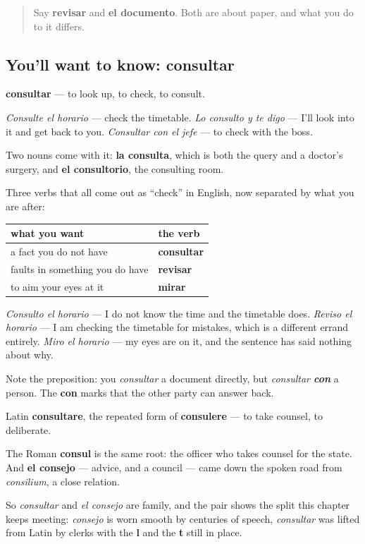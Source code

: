 \label{lesson:ES-C453-consultar}



\begin{quote}
Say \textbf{revisar} and \textbf{el documento}. Both are about paper, and what you do to it differs.
\end{quote}

\subsection*{You'll want to know: consultar}
\textbf{consultar} — to look up, to check, to consult.

\emph{Consulte el horario} — check the timetable. \emph{Lo consulto y te digo} — I'll look into it and get back to you. \emph{Consultar con el jefe} — to check with the boss.

Two nouns come with it: \textbf{la consulta}, which is both the query and a doctor's surgery, and \textbf{el consultorio}, the consulting room.

\begin{grammarlens}[title={Grammar Lens: consultar, revisar, mirar}]
Three verbs that all come out as \textquotedblleft{}check\textquotedblright{} in English, now separated by what you are after:

\noindent
\begin{tabularx}{\linewidth}{@{}>{\raggedright\arraybackslash}X>{\raggedright\arraybackslash}X@{}}
\toprule
\textbf{what you want} & \textbf{the verb} \\
\midrule
a fact you do not have & \textbf{consultar} \\
faults in something you do have & \textbf{revisar} \\
to aim your eyes at it & \textbf{mirar} \\
\bottomrule
\end{tabularx}

\emph{Consulto el horario} — I do not know the time and the timetable does. \emph{Reviso el horario} — I am checking the timetable for mistakes, which is a different errand entirely. \emph{Miro el horario} — my eyes are on it, and the sentence has said nothing about why.

Note the preposition: you \emph{consultar} a document directly, but \emph{consultar \textbf{con}} a person. The \textbf{con} marks that the other party can answer back.
\end{grammarlens}

\begin{cousinweb}
Latin \textbf{consultare}, the repeated form of \textbf{consulere} — to take counsel, to deliberate.

The Roman \textbf{consul} is the same root: the officer who takes counsel for the state. And \textbf{el consejo} — advice, and a council — came down the spoken road from \emph{consilium}, a close relation.

So \emph{consultar} and \emph{el consejo} are family, and the pair shows the split this chapter keeps meeting: \emph{consejo} is worn smooth by centuries of speech, \emph{consultar} was lifted from Latin by clerks with the \textbf{l} and the \textbf{t} still in place.
\end{cousinweb}

